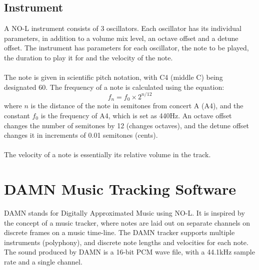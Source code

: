 \documentclass[11pt]{article}
\begin{document}
\subsection{Instrument}
A NO-L instrument consists of 3 oscillators. Each oscillator has its individual parameters, in addition to a volume mix level, an octave offset and a detune offset. The instrument has parameters for each oscillator, the note to be played, the duration to play it for and the velocity of the note.
\\\\
The note is given in scientific pitch notation, with C4 (middle C) being designated 60. The frequency of a note is calculated using the equation: 
\[f_n=f_0\times 2^{n/12}\]
where \(n\) is the distance of the note in semitones from concert A (A4), and the constant \(f_0\) is the frequency of A4, which is set as 440Hz. An octave offset changes the number of semitones by 12 (changes octaves), and the detune offset changes it in increments of 0.01 semitones (cents).\\\\
The velocity of a note is essentially its relative volume in the track.

\section{DAMN Music Tracking Software}
DAMN stands for Digitally Approximated Music using NO-L. It is inspired by the concept of a music tracker, where notes are laid out on separate channels on discrete frames on a music time-line. The DAMN tracker supports multiple instruments (polyphony), and discrete note lengths and velocities for each note. The sound produced by DAMN is a 16-bit PCM wave file, with a 44.1kHz sample rate and a single channel.
\end{document}
